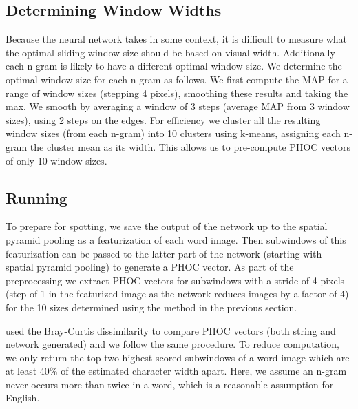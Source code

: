 \documentclass[ms,electronic,twosidetoc,letterpaper,chaptercenter,parttop,lol,lof,lot]{byumsphd}
\begin{document}
\subsection{Determining Window Widths}\label{detirminewindowsize}
Because the neural network takes in some context, it is difficult to measure what the optimal sliding window size should be based on visual width.
Additionally each n-gram is likely to have a different optimal window size. We determine the optimal window size for each n-gram as follows.
We first compute the MAP for a range of window sizes (stepping 4 pixels), smoothing these results and taking the max. We smooth by averaging a window of 3 steps (average MAP from 3 window sizes), using 2 steps on the edges. For efficiency we cluster all the resulting window sizes (from each n-gram) into 10 clusters using k-means, assigning each n-gram the cluster mean as its width. This allows us to pre-compute PHOC vectors of only 10 window sizes.%

\subsection{Running}

To prepare for spotting, we save the output of the network up to the spatial pyramid pooling as a featurization of each word image. Then subwindows of this featurization can be passed to the latter part of the network (starting with spatial pyramid pooling) to generate a PHOC vector. As part of the preprocessing we extract PHOC vectors for subwindows with a stride of 4 pixels (step of 1 in the featurized image as the network reduces images by a factor of 4) for the 10 sizes determined using the method in the previous section.


\cite{sudholt2016} used the Bray-Curtis dissimilarity to compare PHOC vectors (both string and network generated) and we follow the same procedure.
To reduce computation, we only return the top two highest scored subwindows of a word image which are at least 40\% of the estimated character width apart. Here, we assume an n-gram never occurs more than twice in a word, which is a reasonable assumption for English.
\end{document}
